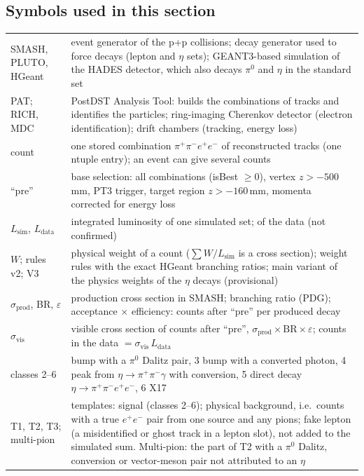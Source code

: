\documentclass[11pt,a4paper]{article}
\renewcommand{\arraystretch}{1.15}
\newcommand{\pip}{\ensuremath{\pi^{+}}\xspace}
\newcommand{\pim}{\ensuremath{\pi^{-}}\xspace}
\newcommand{\piz}{\ensuremath{\pi^{0}}\xspace}
\newcommand{\ee}{\ensuremath{e^{+}e^{-}}\xspace}
\newcommand{\pipi}{\ensuremath{\pi^{+}\pi^{-}}\xspace}
\newcommand{\ppee}{\ensuremath{\pi^{+}\pi^{-}e^{+}e^{-}}\xspace}
\newcommand{\Lsim}{\ensuremath{L_{\mathrm{sim}}}\xspace}
\newcommand{\Ldata}{\ensuremath{L_{\mathrm{data}}}\xspace}
\begin{document}
\subsection{Symbols used in this section}
\label{sec:ressym}
{\footnotesize
\setlength{\tabcolsep}{4pt}
\renewcommand{\arraystretch}{1.08}
\begin{longtable}{@{}>{\raggedright\arraybackslash}p{3.2cm} >{\raggedright\arraybackslash}p{\dimexpr\textwidth-3.2cm-2\tabcolsep\relax}@{}}
\toprule
SMASH, PLUTO, HGeant & event generator of the p+p collisions; decay generator used to force decays (lepton and $\eta$ sets); GEANT3-based simulation of the HADES detector, which also decays \piz and $\eta$ in the standard set \\
PAT; RICH, MDC & PostDST Analysis Tool: builds the combinations of tracks and identifies the particles; ring-imaging Cherenkov detector (electron identification); drift chambers (tracking, energy loss) \\
count & one stored combination \pip\pim$e^+e^-$ of reconstructed tracks (one ntuple entry); an event can give several counts \\
``pre'' & base selection: all combinations (isBest $\ge0$), vertex $z>-500$\,mm, PT3 trigger, target region $z>-160$\,mm, momenta corrected for energy loss \\
\Lsim, \Ldata & integrated luminosity of one simulated set; of the data (not confirmed) \\
$W$; rules v2; V3 & physical weight of a count ($\sum W/\Lsim$ is a cross section); weight rules with the exact HGeant branching ratios; main variant of the physics weights of the $\eta$ decays (provisional) \\
$\sigma_{\mathrm{prod}}$, BR, $\varepsilon$ & production cross section in SMASH; branching ratio (PDG); acceptance $\times$ efficiency: counts after ``pre'' per produced decay \\
$\sigma_{\mathrm{vis}}$ & visible cross section of counts after ``pre'', $\sigma_{\mathrm{prod}}\times\mathrm{BR}\times\varepsilon$; counts in the data $=\sigma_{\mathrm{vis}}\,\Ldata$ \\
classes 2--6 & 2 bump with a \piz Dalitz pair, 3 bump with a converted photon, 4 peak from $\eta\to\pipi\gamma$ with conversion, 5 direct decay $\eta\to\ppee$, 6 X17 \\
T1, T2, T3; multi-pion & templates: signal (classes 2--6); physical background, i.e.\ counts with a true \ee pair from one source and any pions; fake lepton (a misidentified or ghost track in a lepton slot), not added to the simulated sum. Multi-pion: the part of T2 with a \piz Dalitz, conversion or vector-meson pair not attributed to an $\eta$ \\

\end{longtable}}
\end{document}
